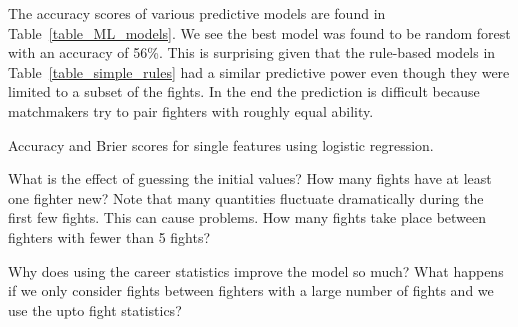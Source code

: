 The accuracy scores of various predictive models are found in Table~\ref{table_ML_models}.
We see the best model was found to be random forest with an accuracy of 56\%. This is
surprising given that the rule-based models in Table~\ref{table_simple_rules} had a
similar predictive power even though they were limited to a subset of the fights.
In the end the prediction is difficult because matchmakers try to pair fighters with
roughly equal ability.

\begin{center}
\begin{table}[h]

\caption{Accuracy and Brier scores for single features using logistic regression.}
\end{table}
\end{center}

What is the effect of guessing the initial values? How many fights have
at least one fighter new? Note that many quantities fluctuate dramatically
during the first few fights. This can cause problems. How many fights take
place between fighters with fewer than 5 fights?

Why does using the career statistics improve the model so much? What
happens if we only consider fights between fighters with a large number
of fights and we use the upto fight statistics? 




